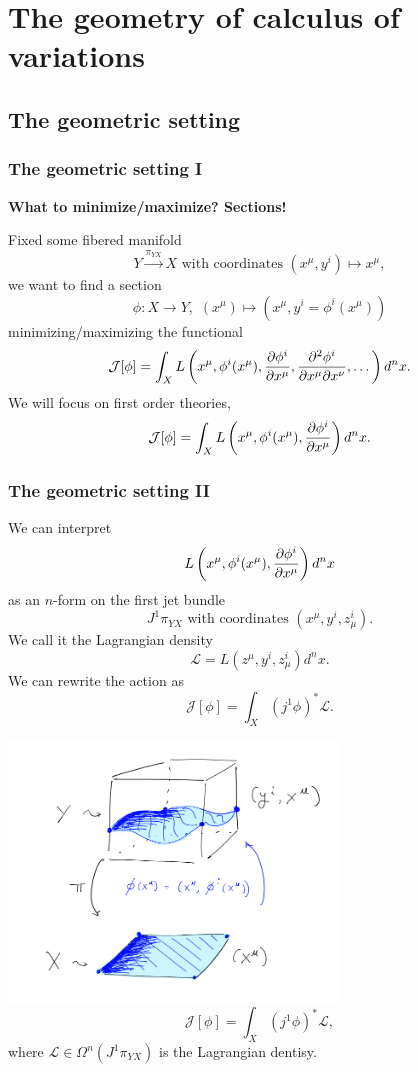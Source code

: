 \section{\bf The geometry of calculus of variations}
\subsection{The geometric setting}
\begin{frame}
    \frametitle{The geometric setting I}
    \begin{center}
        {\large \bf What to minimize/maximize? \alert{Sections!}}
    \end{center}
    Fixed some fibered manifold $$Y \xrightarrow{\pi_{YX}} X \,\, \text{with coordinates } (x^\mu, y^i) \mapsto x^\mu,$$
    we want to find a section $$\phi: X \rightarrow Y,\,\,  (x^\mu) \mapsto (x^\mu, y^i = \phi^i(x^\mu))$$
    minimizing/maximizing the functional $$\mathcal{J}[\phi] = \int_X L\left (x^\mu, \phi^i(x^\mu), \pdv{\phi^i}{x^\mu}, \pdv{\phi^i}{x^\mu}{x^\nu},\dots\right ) d^n x.$$
    We will focus on \alert{first order} theories,
    $$\mathcal{J}[\phi] = \int_X L\left (x^\mu, \phi^i(x^\mu), \pdv{\phi^i}{x^\mu} \right ) d^n x.$$ 
\end{frame}

\begin{frame}
    \frametitle{The geometric setting II}
    We can interpret  $$L\left (x^\mu, \phi^i(x^\mu), \pdv{\phi^i}{x^\mu} \right ) d^n x$$
    as an $n$-form on the first jet bundle $$J^1 \pi_{YX} \text{ with coordinates } (x^\mu, y^i, z^i_\mu).$$ We 
    call it \alert{the Lagrangian density} $$\mathcal{L} = L(z^\mu, y^i, z^i_\mu) d^nx.$$ We can rewrite the action as 
    $$\mathcal{J}[\phi] = \int_X (j^1 \phi)^\ast \mathcal{L}.$$
\end{frame}

\begin{frame}
    \centering
    \includegraphics[width = 250pt]{Images/Variational_problem.PNG}
    $$\mathcal{J}[\phi] = \int_X (j^1\phi)^\ast \mathcal{L},$$
    where $\mathcal{L} \in \Omega^n(J^1  \pi_{YX})$ is the Lagrangian dentisy.
\end{frame}

